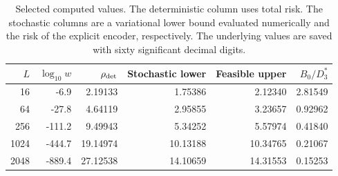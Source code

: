 \begin{table}[ht]
\centering
\begin{tabular}{rrrrrr}
\toprule
$L$ & $\log_{10}w$ & $\rho_{\rm det}$ & Stochastic lower & Feasible upper & $B_0/D_3^*$\\
\midrule
16 & -6.9 & 2.19133 & 1.75386 & 2.12340 & 2.81549\\
64 & -27.8 & 4.64119 & 2.95855 & 3.23657 & 0.92962\\
256 & -111.2 & 9.49943 & 5.34252 & 5.57974 & 0.41840\\
1024 & -444.7 & 19.14974 & 10.13188 & 10.34765 & 0.21067\\
2048 & -889.4 & 27.12538 & 14.10659 & 14.31553 & 0.15253\\
\bottomrule
\end{tabular}
\caption{Selected computed values. The deterministic column uses total risk. The stochastic columns are a variational lower bound evaluated numerically and the risk of the explicit encoder, respectively. The underlying values are saved with sixty significant decimal digits.}
\label{tab:results}
\end{table}
